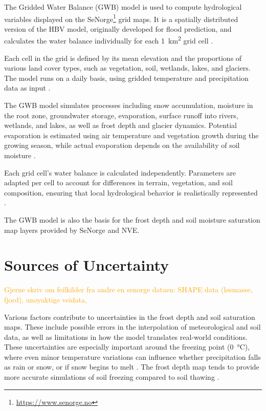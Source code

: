 The Gridded Water Balance (GWB) model is used to compute hydrological variables displayed on the SeNorge\footnote{\url{https://www.senorge.no}} grid maps. It is a spatially distributed version of the HBV model, originally developed for flood prediction, and calculates the water balance individually for each \qty{1}{\kilo\meter\squared} grid cell \cite{nve2025waterdata}.

Each cell in the grid is defined by its mean elevation and the proportions of various land cover types, such as vegetation, soil, wetlands, lakes, and glaciers. The model runs on a daily basis, using gridded temperature and precipitation data as input \cite{nve2025waterdata}.

The GWB model simulates processes including snow accumulation, moisture in the root zone, groundwater storage, evaporation, surface runoff into rivers, wetlands, and lakes, as well as frost depth and glacier dynamics. Potential evaporation is estimated using air temperature and vegetation growth during the growing season, while actual evaporation depends on the availability of soil moisture \cite{nve2025waterdata}.

Each grid cell's water balance is calculated independently. Parameters are adapted per cell to account for differences in terrain, vegetation, and soil composition, ensuring that local hydrological behavior is realistically represented \cite{nve2025waterdata}.

The GWB model is also the basis for the frost depth and soil moisture saturation map layers provided by SeNorge and NVE.

\section{Sources of Uncertainty}

\textcolor{orange}{Gjerne skriv om feilkilder fra andre en senorge dataen: SHAPE data (løsmasse, fjord), unøyaktige veidata, }

Various factors contribute to uncertainties in the frost depth and soil saturation maps. These include possible errors in the interpolation of meteorological and soil data, as well as limitations in how the model translates real-world conditions. These uncertainties are especially important around the freezing point (\qty{0}{\celsius}), where even minor temperature variations can influence whether precipitation falls as rain or snow, or if snow begins to melt \cite{senorge_watermap}. The frost depth map tends to provide more accurate simulations of soil freezing compared to soil thawing \cite{nve2025waterdata}.

